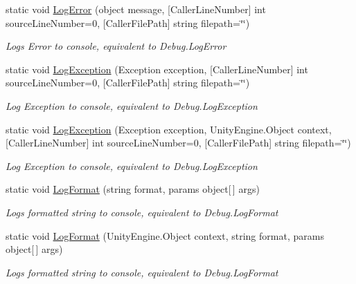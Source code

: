\begin{DoxyCompactItemize}
static void \mbox{\hyperlink{class_s_u_t_log_manager_a45b511264c98490037a7437970d6a492}{Log\+Error}} (object message, \mbox{[}Caller\+Line\+Number\mbox{]} int source\+Line\+Number=0, \mbox{[}Caller\+File\+Path\mbox{]} string filepath=\char`\"{}\char`\"{})
\begin{DoxyCompactList}\small\item\em Logs Error to console, equivalent to Debug.\+Log\+Error \end{DoxyCompactList}\item 
static void \mbox{\hyperlink{class_s_u_t_log_manager_a63a6a0200263f36810d6ede9ca578942}{Log\+Exception}} (Exception exception, \mbox{[}Caller\+Line\+Number\mbox{]} int source\+Line\+Number=0, \mbox{[}Caller\+File\+Path\mbox{]} string filepath=\char`\"{}\char`\"{})
\begin{DoxyCompactList}\small\item\em Log Exception to console, equivalent to Debug.\+Log\+Exception \end{DoxyCompactList}\item 
static void \mbox{\hyperlink{class_s_u_t_log_manager_afff87cc004cbdcf5f3005f81eba4a008}{Log\+Exception}} (Exception exception, Unity\+Engine.\+Object context, \mbox{[}Caller\+Line\+Number\mbox{]} int source\+Line\+Number=0, \mbox{[}Caller\+File\+Path\mbox{]} string filepath=\char`\"{}\char`\"{})
\begin{DoxyCompactList}\small\item\em Log Exception to console, equivalent to Debug.\+Log\+Exception \end{DoxyCompactList}\item 
static void \mbox{\hyperlink{class_s_u_t_log_manager_a188ae94dc81d8dcc77e403a1bf8c0aa0}{Log\+Format}} (string format, params object\mbox{[}$\,$\mbox{]} args)
\begin{DoxyCompactList}\small\item\em Logs formatted string to console, equivalent to Debug.\+Log\+Format \end{DoxyCompactList}\item 
static void \mbox{\hyperlink{class_s_u_t_log_manager_a8abdde905d033f341b059364732c41b6}{Log\+Format}} (Unity\+Engine.\+Object context, string format, params object\mbox{[}$\,$\mbox{]} args)
\begin{DoxyCompactList}\small\item\em Logs formatted string to console, equivalent to Debug.\+Log\+Format \end{DoxyCompactList}\item 

\end{DoxyCompactItemize}
